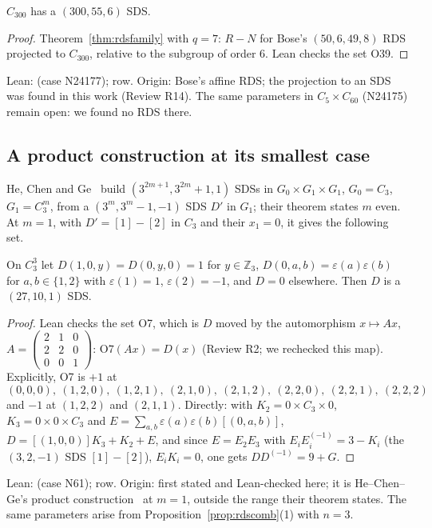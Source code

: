 \begin{theorem}\label{thm:z21}
$C_{300}$ has a $(300, 55, 6)$ SDS.
\end{theorem}

\begin{proof}
Theorem~\ref{thm:rdsfamily} with $q = 7$: $R - N$ for Bose's $(50, 6, 49, 8)$ RDS projected to
$C_{300}$, relative to the subgroup of order $6$. Lean checks the set O39.
\end{proof}

\begin{remark}
Lean:  (case N24177);  row. Origin: Bose's affine RDS;
the projection to an SDS was found in this work (Review R14). The same parameters in
$C_5 \times C_{60}$ (N24175) remain open: we found no RDS there.
\end{remark}

\subsection{A product construction at its smallest case}

He, Chen and Ge~\cite[Thm.~4.1]{he-chen-ge} build $(3^{2m+1}, 3^{2m} + 1, 1)$ SDSs in
$G_0 \times G_1 \times G_1$, $G_0 = C_3$, $G_1 = C_3^m$, from a $(3^m, 3^m - 1, -1)$ SDS $D'$
in $G_1$; their theorem states $m$ even. At $m = 1$, with $D' = [1] - [2]$ in $C_3$ and their
$x_1 = 0$, it gives the following set.

\begin{theorem}\label{thm:z4}
On $C_3^3$ let $D(1, 0, y) = D(0, y, 0) = 1$ for $y \in \mathbb{Z}_3$,
$D(0, a, b) = \varepsilon(a)\varepsilon(b)$ for $a, b \in \{1, 2\}$ with $\varepsilon(1) = 1$,
$\varepsilon(2) = -1$, and $D = 0$ elsewhere. Then $D$ is a $(27, 10, 1)$ SDS.
\end{theorem}

\begin{proof}
Lean checks the set O7, which is $D$ moved by the automorphism
$x \mapsto Ax$, $A = \left(\begin{smallmatrix} 2&1&0\\ 2&2&0\\ 0&0&1 \end{smallmatrix}\right)$:
$\mathrm{O7}(Ax) = D(x)$ (Review R2; we rechecked this map). Explicitly, O7 is $+1$ at
\[
  (0,0,0),\ (1,2,0),\ (1,2,1),\ (2,1,0),\ (2,1,2),\ (2,2,0),\ (2,2,1),\ (2,2,2)
\]
and $-1$ at $(1,2,2)$ and $(2,1,1)$. Directly: with $K_2 = 0 \times C_3 \times 0$,
$K_3 = 0 \times 0 \times C_3$ and $E = \sum_{a,b} \varepsilon(a)\varepsilon(b)[(0,a,b)]$,
$D = [(1,0,0)]K_3 + K_2 + E$, and since $E = E_2E_3$ with $E_iE_i^{(-1)} = 3 - K_i$
(the $(3, 2, -1)$ SDS $[1] - [2]$), $E_iK_i = 0$, one gets
$DD^{(-1)} = 9 + G$.
\end{proof}

\begin{remark}
Lean:  (case N61);  row. Origin: first stated and Lean-checked
here; it is He--Chen--Ge's product construction~\cite[\S4]{he-chen-ge} at $m = 1$, outside the
range their theorem states. The same parameters arise from
Proposition~\ref{prop:rdscomb}(1) with $n = 3$.
\end{remark}
